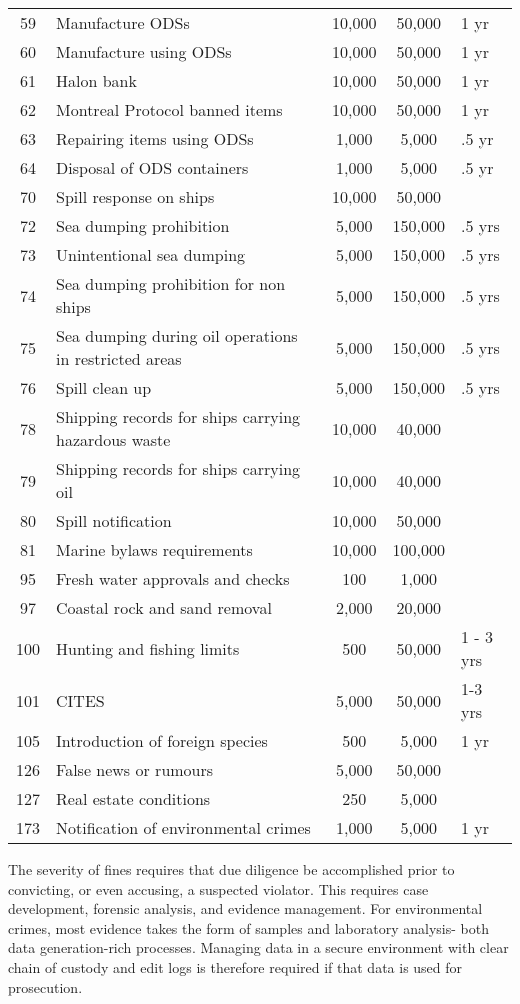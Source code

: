 \begin{table}[H]
{\begin{tabular}{@{}clccl@{}}
59 & Manufacture ODSs & 10,000 & 50,000 & 1 yr \\
60 & Manufacture using ODSs & 10,000 & 50,000 & 1 yr \\
61 & Halon bank & 10,000 & 50,000 & 1 yr \\
62 & Montreal Protocol banned items & 10,000 & 50,000 & 1 yr \\
63 & Repairing items using ODSs & 1,000 & 5,000 & .5 yr \\
64 & Disposal of ODS containers & 1,000 & 5,000 & .5 yr \\
70 & Spill response on ships & 10,000 & 50,000 &  \\
72 & Sea dumping prohibition & 5,000 & 150,000 & .5 yrs \\
73 & Unintentional sea dumping & 5,000 & 150,000 & .5 yrs \\
74 & Sea dumping prohibition for non ships & 5,000 & 150,000 & .5 yrs \\
75 & Sea dumping during oil operations in restricted areas & 5,000 & 150,000 & .5 yrs \\
76 & Spill clean up & 5,000 & 150,000 & .5 yrs \\
78 & Shipping records for ships carrying hazardous waste & 10,000 & 40,000 &  \\
79 & Shipping records for ships carrying oil & 10,000 & 40,000 &  \\
80 & Spill notification & 10,000 & 50,000 &  \\
81 & Marine bylaws requirements & 10,000 & 100,000 &  \\
95 & Fresh water approvals and checks & 100 & 1,000 &  \\
97 & Coastal rock and sand removal & 2,000 & 20,000 &  \\
100 & Hunting and fishing limits & 500 & 50,000 & 1 - 3 yrs \\
101 & CITES & 5,000 & 50,000 & 1-3 yrs \\
105 & Introduction of foreign species & 500 & 5,000 & 1 yr \\
126 & False news or rumours & 5,000 & 50,000 &  \\
127 & Real estate conditions & 250 & 5,000 &  \\
173 & Notification of environmental crimes & 1,000 & 5,000 & 1 yr \\ \bottomrule
\end{tabular}
} %
\end{table}

The severity of fines requires that due diligence be accomplished prior to convicting, or even accusing, a suspected violator. This requires case development, forensic analysis, and evidence management. For environmental crimes, most evidence takes the form of samples and laboratory analysis- both data generation-rich processes. Managing data in a secure environment with clear chain of custody and edit logs is therefore required if that data is used for prosecution.

